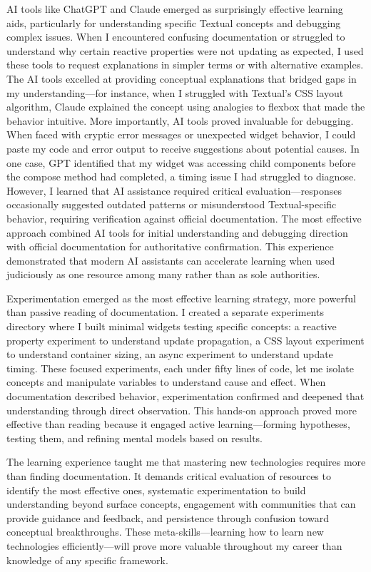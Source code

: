 \documentclass[12pt,a4paper]{article}
\begin{document}
AI tools like ChatGPT and Claude emerged as surprisingly effective learning aids, particularly for understanding specific Textual concepts and debugging complex issues. When I encountered confusing documentation or struggled to understand why certain reactive properties were not updating as expected, I used these tools to request explanations in simpler terms or with alternative examples. The AI tools excelled at providing conceptual explanations that bridged gaps in my understanding—for instance, when I struggled with Textual's CSS layout algorithm, Claude explained the concept using analogies to flexbox that made the behavior intuitive. More importantly, AI tools proved invaluable for debugging. When faced with cryptic error messages or unexpected widget behavior, I could paste my code and error output to receive suggestions about potential causes. In one case, GPT identified that my widget was accessing child components before the compose method had completed, a timing issue I had struggled to diagnose. However, I learned that AI assistance required critical evaluation—responses occasionally suggested outdated patterns or misunderstood Textual-specific behavior, requiring verification against official documentation. The most effective approach combined AI tools for initial understanding and debugging direction with official documentation for authoritative confirmation. This experience demonstrated that modern AI assistants can accelerate learning when used judiciously as one resource among many rather than as sole authorities.

Experimentation emerged as the most effective learning strategy, more powerful than passive reading of documentation. I created a separate experiments directory where I built minimal widgets testing specific concepts: a reactive property experiment to understand update propagation, a CSS layout experiment to understand container sizing, an async experiment to understand update timing. These focused experiments, each under fifty lines of code, let me isolate concepts and manipulate variables to understand cause and effect. When documentation described behavior, experimentation confirmed and deepened that understanding through direct observation. This hands-on approach proved more effective than reading because it engaged active learning—forming hypotheses, testing them, and refining mental models based on results.

The learning experience taught me that mastering new technologies requires more than finding documentation. It demands critical evaluation of resources to identify the most effective ones, systematic experimentation to build understanding beyond surface concepts, engagement with communities that can provide guidance and feedback, and persistence through confusion toward conceptual breakthroughs. These meta-skills—learning how to learn new technologies efficiently—will prove more valuable throughout my career than knowledge of any specific framework.
\end{document}
